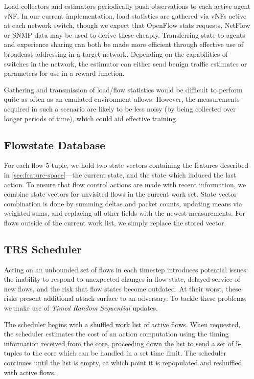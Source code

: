 \documentclass[10pt, times, conference, letterpaper]{IEEEtran}
\begin{document}
Load collectors and estimators periodically push observations to each active agent vNF.
In our current implementation, load statistics are gathered via vNFs active at each network switch, though we expect that OpenFlow stats requests, NetFlow or SNMP data may be used to derive these cheaply.
Transferring state to agents and experience sharing can both be made more efficient through effective use of broadcast addressing in a target network.
Depending on the capabilities of switches in the network, the estimator can either send benign traffic estimates or parameters for use in a reward function.

Gathering and transmission of load/flow statistics would be difficult to perform quite as often as an emulated environment allows.
However, the measurements acquired in such a scenario are likely to be less noisy (by being collected over longer periods of time), which could aid effective training.

\subsection{Flowstate Database}
For each flow 5-tuple, we hold two state vectors containing the features described in \cref{sec:feature-space}---the current state, and the state which induced the last action.
To ensure that flow control actions are made with recent information, we combine state vectors for unvisited flows in the current work set.
State vector combination is done by summing deltas and packet counts, updating means via weighted sums, and replacing all other fields with the newest measurements.
For flows outside of the current work list, we simply replace the stored vector.

\subsection{TRS Scheduler}
Acting on an unbounded set of flows in each timestep introduces potential issues: the inability to respond to unexpected changes in flow state, delayed service of new flows, and the risk that flow states become outdated.
At their worst, these risks present additional attack surface to an adversary.
To tackle these problems, we make use of \emph{Timed Random Sequential} updates.

The scheduler begins with a shuffled work list of active flows.
When requested, the scheduler estimates the cost of an action computation using the timing information received from the core, proceeding down the list to send a set of 5-tuples to the core which can be handled in a set time limit.
The scheduler continues until the list is empty, at which point it is repopulated and reshuffled with active flows.
\end{document}
